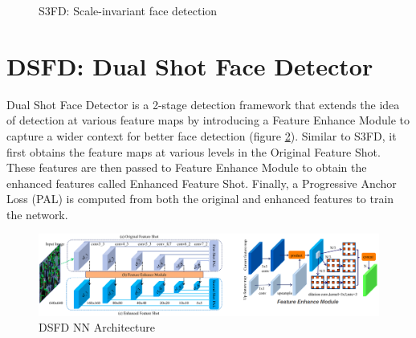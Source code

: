 \begin{figure}[h]
{{        \label{fig:maxOutBgLabel_problem}
    }}
    \quad
    \caption{S3FD: Scale-invariant face detection}
\end{figure}


\section{DSFD: Dual Shot Face Detector}
Dual Shot Face Detector \cite{dsfd2018} is a 2-stage detection framework that extends the idea of detection at various feature maps by introducing a Feature Enhance Module to capture a wider context for better face detection (figure \ref{fig:dsfdNN}). Similar to S3FD, it first obtains the feature maps at various levels in the Original Feature Shot. These features are then passed to Feature Enhance Module to obtain the enhanced features called Enhanced Feature Shot. Finally, a Progressive Anchor Loss (PAL) is computed from both the original and enhanced features to train the network.

\begin{figure}[h]
  \centering
    \includegraphics[width=1.0\textwidth]{LiteratureSurvey/DSFD_NN}
    \caption[DSFD]{DSFD NN Architecture}
    \label{fig:dsfdNN} 
\end{figure}

